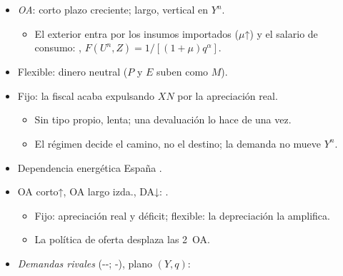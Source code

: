 \documentclass{article}
\begin{document}
\begin{columnas}
\begin{itemize}
\begin{itemize}
  \end{itemize}
\end{itemize}
\begin{itemize}
\item \emph{OA}: corto plazo creciente; largo, vertical en $Y^n$.
  \begin{itemize}
  \item El exterior entra por los insumos importados ($\mu$↑) y el salario de consumo: , $F(U^n,Z)=1/[(1+\mu)q^\alpha]$.
  \end{itemize}
\end{itemize}
\begin{itemize}
\item Flexible: dinero neutral ($P$ y $E$ suben como $M$).
\item Fijo: la fiscal acaba expulsando $XN$ por la apreciación real.
  \begin{itemize}
  \item Sin tipo propio,  lenta; una devaluación lo hace de una vez.
  \item El régimen decide el camino, no el destino; la demanda no mueve $Y^n$.
  \end{itemize}
\end{itemize}
\begin{itemize}
\item Dependencia energética España .
\item OA corto↑, OA largo izda., DA↓: .
  \begin{itemize}
  \item Fijo: apreciación real y déficit; flexible: la depreciación la amplifica.
  \item La política de oferta desplaza las 2~OA.
  \end{itemize}
\end{itemize}
\begin{itemize}
\item \emph{Demandas rivales} (--; -), plano $(Y,q)$:

\end{itemize}
\end{columnas}
\end{document}
